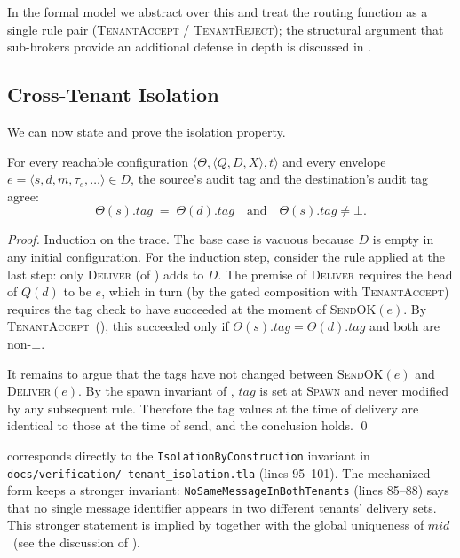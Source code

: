 In the formal model we abstract over this and treat the routing
function as a single rule pair (\textsc{TenantAccept} /
\textsc{TenantReject}); the structural argument that sub-brokers
provide an additional defense in depth is discussed in
.

\subsection{Cross-Tenant Isolation}
\label{sec:tenancy:isolation}

We can now state and prove the isolation property.

\begin{theorem}
\label{thm:cross-tenant-isolation}
For every reachable configuration \(\langle \Theta, \langle Q, D,
X\rangle, t\rangle\) and every envelope \(e = \langle s, d, m,
\tau_e, \ldots\rangle \in D\), the source's audit tag and the
destination's audit tag agree:
\[
  \Theta(s).\mathit{tag} \;=\; \Theta(d).\mathit{tag}
  \quad\text{and}\quad
  \Theta(s).\mathit{tag} \neq \bot.
\]
\end{theorem}

\begin{proof}
Induction on the trace.  The base case is vacuous because \(D\) is
empty in any initial configuration.  For the induction step,
consider the rule applied at the last step: only \textsc{Deliver}
(of ) adds to \(D\).  The premise of
\textsc{Deliver} requires the head of \(Q(d)\) to be \(e\), which
in turn (by the gated composition with \textsc{TenantAccept})
requires the tag check to have succeeded at the moment of
\textsc{SendOK}\((e)\).  By \textsc{TenantAccept}~(),
this succeeded only if \(\Theta(s).\mathit{tag} =
\Theta(d).\mathit{tag}\) and both are non-\(\bot\).

It remains to argue that the tags have not changed between
\textsc{SendOK}\((e)\) and \textsc{Deliver}\((e)\).  By the
spawn invariant of , \(\mathit{tag}\)
is set at \textsc{Spawn} and never modified by any subsequent
rule.  Therefore the tag values at the time of delivery are
identical to those at the time of send, and the conclusion holds.
\qed
\end{proof}

 corresponds directly to the
\texttt{IsolationByConstruction} invariant in
\texttt{docs/\allowbreak verification/\allowbreak
tenant\_isolation.\allowbreak tla} (lines 95--101).
The mechanized form keeps a stronger invariant:
\texttt{NoSameMessageInBothTenants} (lines 85--88) says that no
single message identifier appears in two different tenants' delivery
sets.  This stronger statement is implied by
 together with the global
uniqueness of \(\mathit{mid}\)~(see the discussion of
).

